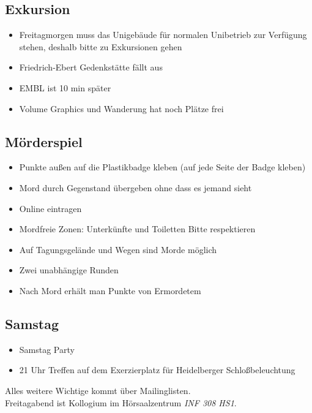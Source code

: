   \subsection{Exkursion}
    \begin{itemize}
    \item Freitagmorgen muss das Unigebäude für normalen Unibetrieb zur Verfügung stehen, deshalb bitte zu Exkursionen gehen
    \item Friedrich-Ebert Gedenkstätte fällt aus
    \item EMBL ist 10 min später
    \item Volume Graphics und Wanderung hat noch Plätze frei
    \end{itemize}

  \subsection{Mörderspiel}
    \begin{itemize}
      \item Punkte außen auf die Plastikbadge kleben (auf jede Seite der Badge kleben)
      \item Mord durch Gegenstand übergeben ohne dass es jemand sieht
      \item Online eintragen
      \item Mordfreie Zonen: Unterkünfte und Toiletten Bitte respektieren
      \item Auf Tagungsgelände und Wegen sind Morde möglich
      \item Zwei unabhängige Runden
      \item Nach Mord erhält man Punkte von Ermordetem
    \end{itemize}

  \subsection{Samstag}
    \begin{itemize}
      \item Samstag Party
      \item 21 Uhr Treffen auf dem Exerzierplatz für Heidelberger Schloßbeleuchtung
    \end{itemize}

  Alles weitere Wichtige kommt über Mailinglisten. \\
  Freitagabend ist Kollogium im Hörsaalzentrum \textit{INF 308 HS1}. \\ \\

